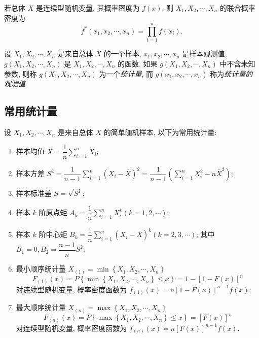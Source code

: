 若总体 $ X $ 是连续型随机变量, 其概率密度为 $ f(x) $, 则 $ X_{1}, X_{2}, \cdots, X_{n} $ 的联合概率密度为 $$ f^{*}\left(x_{1}, x_{2}, \cdots, x_{n}\right)=\prod_{i=1}^{n} f\left(x_{i}\right).$$

\begin{definition}[统计量与其观测值]
    设 $ X_{1}, X_{2}, \cdots, X_{n} $ 是来自总体 $ X $ 的一个样本, $ x_{1}, x_{2}, \cdots, x_{n} $ 是样本观测值, $ g\left(X_{1}, X_{2}, \cdots, X_{n}\right) $ 是 $ X_{1}, X_{2}, \cdots, X_{n} $ 的函数. 如果 $ g\left(X_{1}, X_{2}, \cdots, X_{n}\right) $ 中不含未知参数, 则称 $ g\left(X_{1}, X_{2}, \cdots, X_{n}\right) $ 为一个\textit{统计量}, 而 $ g\left(x_{1}, x_{2}, \cdots, x_{n}\right) $ 称为\textit{统计量的观测值}.
\end{definition}

\subsection{常用统计量}

\begin{definition}[常用统计量]
    设 $ X_{1}, X_{2}, \cdots, X_{n} $ 是来自总体 $ X $ 的简单随机样本, 以下为常用统计量:
    \begin{enumerate}[label=(\arabic{*})]
        \item 样本均值 $ \bar{X}=\dfrac{1}{n} \displaystyle\sum_{i=1}^{n} X_{i} $;
        \item 样本方差 $S^{2}=\dfrac{1}{n-1} \displaystyle\sum_{i=1}^{n}\left(X_{i}-\bar{X}\right)^{2}=\dfrac{1}{n-1}\left(\displaystyle\sum_{i=1}^{n} X_{i}^{2}-n \bar{X}^{2}\right) $;
        \item 样本标准差 $ S=\sqrt{S^{2}} $;
        \item 样本 $ k $ 阶原点矩 $A_{k}=\dfrac{1}{n} \displaystyle\sum_{i=1}^{n} X_{i}^{k}(k=1,2, \cdots) $;
        \item 样本 $ k $ 阶中心矩 $B_{k}=\dfrac{1}{n} \displaystyle\sum_{i=1}^{n}\left(X_{i}-\bar{X}\right)^{k}(k=2,3, \cdots) $;
        其中 $ B_{1}=0, B_{2}=\dfrac{n-1}{n} S^{2} $;
        \item 最小顺序统计量 $X_{(1)}=\min \left\{X_{1}, X_{2}, \cdots, X_{n}\right\}$
        $$F_{(1)}(x)=P\left\{\min \left\{X_{1}, X_{2}, \cdots, X_{n}\right\} \leqslant x\right\}=1-[1-F(x)]^{n}$$
        对连续型随机变量, 概率密度函数为 $f_{(1)}(x)=n[1-F(x)]^{n-1} f(x) $;
        \item 最大顺序统计量 $X_{(n)}=\max \left\{X_{1}, X_{2}, \cdots, X_{n}\right\}$
        $$F_{(n)}(x)=P\left\{\max \left\{X_{1}, X_{2}, \cdots, X_{n}\right\} \leqslant x\right\}=[F(x)]^{n}$$
        对连续型随机变量, 概率密度函数为 $f_{(n)}(x)=n[F(x)]^{n-1} f(x) .$
    \end{enumerate}
\end{definition}

